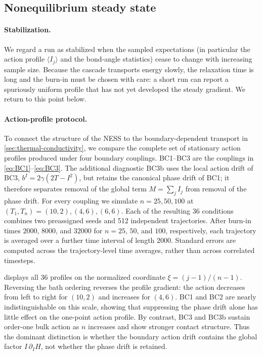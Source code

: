 \documentclass[11pt,a4paper]{article}
\theoremstyle{definition}
\numberwithin{equation}{section}   %
\begin{document}
\subsection{Nonequilibrium steady state}\label{sec:ness-long}

\paragraph{Stabilization.}
We regard a run as stabilized when the sampled expectations (in particular the
action profile $\langle I_j\rangle$ and the bond-angle statistics) cease to
change with increasing sample size. Because the cascade transports energy
slowly, the relaxation time is long and the burn-in must be chosen with care:
a short run can report a spuriously uniform profile that has not yet developed
the steady gradient. We return to this point below.

\paragraph{Action-profile protocol.}
To connect the structure of the NESS to the boundary-dependent transport in
\cref{sec:thermal-conductivity}, we compare the complete set of stationary
action profiles produced under four boundary couplings.  BC1--BC3 are the
couplings in \eqref{eq:BC1}--\eqref{eq:BC3}.  The additional diagnostic BC3b
uses the local action drift of BC3,
$b^I=2\gamma(2T-I^2)$, but retains the canonical phase drift of BC1; it
therefore separates removal of the global term $M=\sum_j I_j$ from removal of
the phase drift.  For every coupling we simulate $n=25,50,100$ at
$(T_1,T_n)=(10,2),(4,6),(6,6)$.  Each of the resulting 36 conditions combines
two preassigned seeds and 512 independent trajectories.  After burn-in times
$2000$, $8000$, and $32000$ for $n=25$, $50$, and $100$, respectively, each
trajectory is averaged over a further time interval of length $2000$.
Standard errors are computed across the trajectory-level time averages, rather
than across correlated timesteps.

 displays all 36 profiles on the normalized coordinate
$\xi=(j-1)/(n-1)$.  Reversing the bath ordering reverses the profile gradient:
the action decreases from left to right for $(10,2)$ and increases for $(4,6)$.
BC1 and BC2 are nearly indistinguishable on this scale, showing that suppressing
the phase drift alone has little effect on the one-point action profile.  By
contrast, BC3 and BC3b sustain order-one bulk action as $n$ increases and show
stronger contact structure.  Thus the dominant distinction is whether the
boundary action drift contains the global factor $I\,\partial_IH$, not whether
the phase drift is retained.
\end{document}
